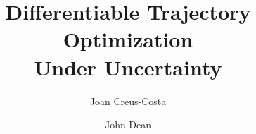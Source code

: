 \documentclass[11pt]{scrartcl} %
\title{\bfseries Differentiable Trajectory Optimization\\ Under Uncertainty}
\author{Joan Creus-Costa\and John Dean}
\begin{document}
\maketitle

\def\States{\mathcal{S}}
\def\Altitudes{\mathcal{H}}
\def\Velocities{\mathcal{V}}
\def\Lifts{\mathcal{L}}

\newcommand{\R}{\mathbb{R}}
\newcommand*{\vertbar}{\rule[-1ex]{0.5pt}{2.5ex}}
\newcommand*{\horzbar}{\rule[.5ex]{2.5ex}{0.5pt}}
\newcommand{\probs}[3]{\paragraph{Problem #1} \textit{#2}
\begin{description}[labelwidth=.7cm,labelindent=0cm,leftmargin=0.9cm,align=left]
#3
\end{description}
}
\newcommand{\prob}[3]{\paragraph{Problem #1} \textit{#2}{#3}}
\newcommand{\prt}[1]{\subsection*{(#1)}}
\newcommand{\n}[1]{\mathrm{#1}}
\newcommand{\nb}[1]{\mathrm{\textbf{#1}}}
\newcommand{\mx}[2]{\left[ \begin{array}{#1} #2 \end{array} \right]}
\newcommand{\ig}[2]{\begin{center}\texttt{[image: \#2]}\end{center}}
\newcommand{\ls}[1]{\begin{lstlisting} #1 \end{lstlisting}} 
\newcommand{\conv}[1]{\mathrm{\textbf{conv}}\{ #1 \}}
\newcommand{\headfoot}[3]{
\pagestyle{fancy}
\lhead{#1}
\chead{#2}
\rhead{#3}
\lfoot{}
\cfoot{\thepage}
\rfoot{}
}

\newcommand{\ones}{\mathbf 1}
\newcommand{\reals}{{\mbox{\bf R}}}
\newcommand{\integers}{{\mbox{\bf Z}}}
\newcommand{\symm}{{\mbox{\bf S}}}  %

\newcommand{\nullspace}{{\mathcal N}}
\newcommand{\range}{{\mathcal R}}
\newcommand{\Rank}{\mathop{\bf Rank}}
\newcommand{\Tr}{\mathop{\bf Tr}}
\newcommand{\diag}{\mathop{\bf diag}}
\newcommand{\card}{\mathop{\bf card}}
\newcommand{\rank}{\mathop{\bf rank}}
\newcommand{\prox}{\mathbf{prox}}

\newcommand{\Expect}{\mathop{\bf E{}}}
\newcommand{\Prob}{\mathop{\bf Prob}}
\newcommand{\Co}{{\mathop {\bf Co}}} %
\newcommand{\dist}{\mathop{\bf dist{}}}
\newcommand{\argmin}{\mathop{\rm argmin}}
\newcommand{\argmax}{\mathop{\rm argmax}}
\newcommand{\epi}{\mathop{\bf epi}} %
\newcommand{\Vol}{\mathop{\bf vol}}
\newcommand{\dom}{\mathop{\bf dom}} %
\newcommand{\intr}{\mathop{\bf int}}
\newcommand{\sign}{\mathop{\bf sign}}
\end{document}
